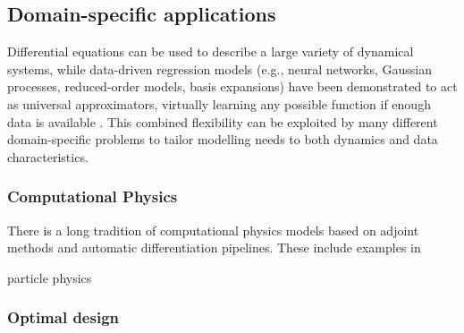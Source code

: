 
\subsection{Domain-specific applications}

Differential equations can be used to describe a large variety of dynamical systems, while data-driven regression models (e.g., neural networks, Gaussian processes, reduced-order models, basis expansions) have been demonstrated to act as universal approximators, virtually learning any possible function if enough data is available \cite{gorban_1998}. 
This combined flexibility can be exploited by many different domain-specific problems to tailor modelling needs to both dynamics and data characteristics.


\subsubsection{Computational Physics}

There is a long tradition of computational physics models based on adjoint methods and automatic differentiation pipelines. 
These include examples in 

particle physics \cite{Dorigo.2022}

\subsubsection{Optimal design}

